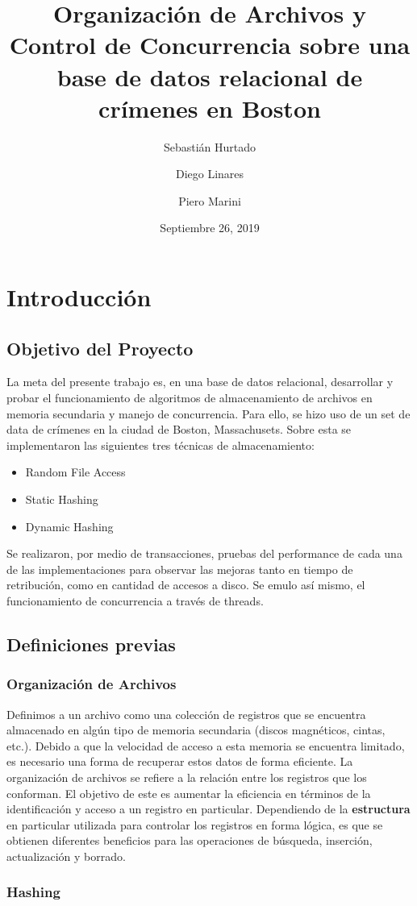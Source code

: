 \documentclass{article}
\title{Organización de Archivos y Control de Concurrencia sobre una base de datos relacional de crímenes en Boston}
\author{Sebastián Hurtado \and Diego Linares \and Piero Marini}
\date{Septiembre 26, 2019}
\begin{document}
  
  \maketitle

  \section{Introducción}
    
    \subsection{Objetivo del Proyecto}
      
      La meta del presente trabajo es, en una base de datos relacional, desarrollar y probar el funcionamiento de algoritmos de almacenamiento de archivos en memoria secundaria y manejo de concurrencia. Para ello, se hizo uso de un set de data de crímenes en la ciudad de Boston, Massachusets. Sobre esta se implementaron las siguientes tres técnicas de almacenamiento:
      \begin{itemize}
        \item Random File Access
        \item Static Hashing
        \item Dynamic Hashing
      \end{itemize}
      Se realizaron, por medio de transacciones, pruebas del performance de cada una de las implementaciones para observar las mejoras tanto en tiempo de retribución, como en cantidad de accesos a disco. Se emulo así mismo, el funcionamiento de concurrencia a través de threads. 
    
    \subsection{Definiciones previas}  
      
      \subsubsection{Organización de Archivos}
      
        Definimos a un archivo como una colección de registros que se encuentra almacenado en algún tipo de memoria secundaria (discos magnéticos, cintas, etc.). Debido a que la velocidad de acceso a esta memoria se encuentra limitado, es necesario una forma de recuperar estos datos de forma eficiente. La organización de archivos se refiere a la relación entre los registros que los conforman. El objetivo de este es aumentar la eficiencia en términos de la identificación y acceso a un registro en particular. Dependiendo de la \textbf{estructura} en particular utilizada para controlar los registros en forma lógica, es que se obtienen diferentes beneficios para las operaciones de búsqueda, inserción, actualización y borrado.
      
      \subsubsection{Hashing} 
        
              
\end{document}
